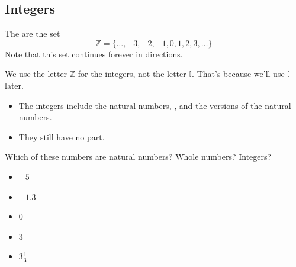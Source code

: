 \subsection{Integers} 
\begin{definition}[Integers]
The  are the set
\[
\mathbb{Z}=\{\dots,-3,-2,-1,0,1,2,3,\dots\}
\]
Note that this set continues forever in \makeblank[1in] directions.
\end{definition}
\begin{Note}
We use the letter $\mathbb{Z}$ for the integers, not the letter $\mathbb{I}$. That's because we'll use $\mathbb{I}$ later.
\end{Note}
\begin{itemize}
\item The integers include the \makeblank[1.5in] natural numbers, \makeblanksmall, and the \makeblank[1.5in] versions of the natural numbers.
\item They still have no \makeblank[1.5in] part.
\end{itemize}
\begin{Example}
Which of these numbers are natural numbers? Whole numbers? Integers?
\begin{itemize}
\item $-5$   
\makeblanknew
\item $-1.3$   
\makeblanknew
\item $0$   
\makeblanknew
\item $3$   
\makeblanknew
\item $3\frac{1}{3}$   
\makeblanknew
\end{itemize}
\end{Example}